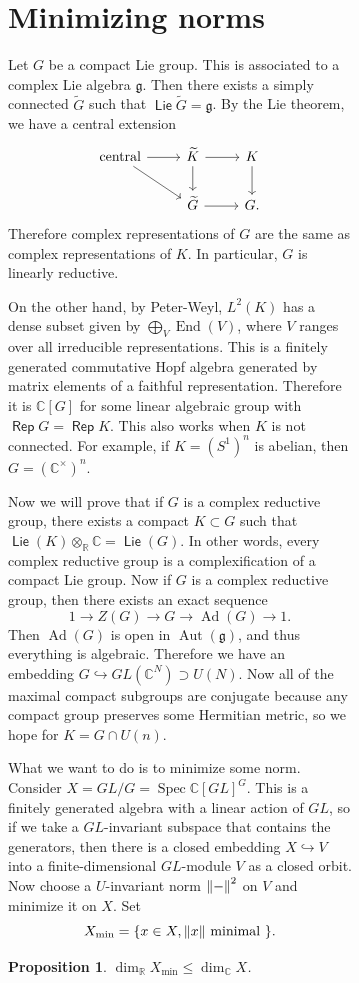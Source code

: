 \documentclass[leqno, openany]{memoir}
\newtheorem{prop}[thm]{Proposition}
\theoremstyle{definition}
\theoremstyle{remark}
\theoremstyle{plain}
\theoremstyle{definition}
\theoremstyle{remark}
\newcommand{\R}{\mathbb{R}}
\newcommand{\C}{\mathbb{C}}
\newcommand{\mf}[1]{\mathfrak{#1}}
\newcommand{\wtl}[1]{\widetilde{#1}}
\DeclareMathOperator{\End}{End}
\DeclareMathOperator{\Ad}{Ad}
\DeclareMathOperator{\Aut}{Aut}
\DeclareMathOperator{\Spec}{Spec}
\DeclareMathOperator{\Lie}{\mathsf{Lie}}
\DeclareMathOperator{\Rep}{\mathsf{Rep}}
\begin{document}
\begin{figure}[H]
\begin{figure}[H]
\section{Minimizing norms}%

Let $G$ be a compact Lie group. This is associated to a complex Lie algebra
$\mf{g}$. Then there exists a simply connected $\wtl{G}$ such that $\Lie
\wtl{G} = \mf{g}$. By the Lie theorem, we have a central extension
\begin{equation*} \begin{tikzcd} \text{central} \ar{r} \ar{dr} & \wtl{K} \ar{r}
\ar{d} & K \ar{d} \\ & \wtl{G} \ar{r} & G.  \end{tikzcd} \end{equation*}
Therefore complex representations of $G$ are the same as complex
representations of $K$. In particular, $G$ is linearly reductive.

On the other hand, by Peter-Weyl, $L^2(K)$ has a dense subset given by
$\bigoplus_{V} \End(V)$, where $V$ ranges over all irreducible representations.
This is a finitely generated commutative Hopf algebra generated by matrix
elements of a faithful representation. Therefore it is $\C[G]$ for some linear
algebraic group with $\Rep G = \Rep K$. This also works when $K$ is not
connected. For example, if $K = {(S^1)}^n$ is abelian, then $G =
{(\C^{\times})}^n$.

Now we will prove that if $G$ is a complex reductive group, there exists a
compact $K \subset G$ such that $\Lie(K) \otimes_{\R} \C = \Lie(G)$. In other
words, every complex reductive group is a complexification of a compact Lie
group. Now if $G$ is a complex reductive group, then there exists an exact
sequence \[ 1 \to Z(G) \to G \to \Ad(G) \to 1. \] Then $\Ad(G)$ is open in
$\Aut(\mf{g})$, and thus everything is algebraic. Therefore we have an
embedding $G \hookrightarrow GL(\C^N) \supset U(N)$. Now all of the maximal
compact subgroups are conjugate because any compact group preserves some
Hermitian metric, so we hope for $K = G \cap U(n)$.

What we want to do is to minimize some norm. Consider $X = GL/G = {\Spec
\C[GL]}^G$. This is a finitely generated algebra with a linear action of $GL$,
so if we take a $GL$-invariant subspace that contains the generators, then
there is a closed embedding $X \hookrightarrow V$ into a finite-dimensional
$GL$-module $V$ as a closed orbit. Now choose a $U$-invariant norm $\norm{-}^2$
on $V$ and minimize it on $X$. Set \[ X_{\min} = \qty{x \in X, \norm{x} \text{
minimal }}. \] \begin{prop} $\dim_{\R} X_{\min} \leq \dim_{\C} X$.  \end{prop}


\end{figure}
\end{figure}
\end{document}
